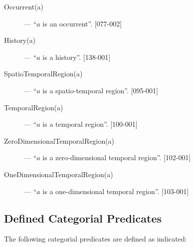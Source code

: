 \documentclass{article}
\newcommand{\DF}{\ensuremath{=_{df}}}
\begin{document}
\begin{description}
\item[Occurrent(a)] --- ``$a$ is an occurrent''. [077-002]

\item[History(a)] --- ``$a$ is a history''.  [138-001]

\item[SpatioTemporalRegion(a)] --- ``$a$ is a spatio-temporal region''. [095-001]

\item[TemporalRegion(a)] --- ``$a$ is a temporal region''. [100-001]

\item[ZeroDimensionalTemporalRegion(a)] --- ``$a$ is a zero-dimensional temporal region''. [102-001]

\item[OneDimensionalTemporalRegion(a)] --- ``$a$ is a one-dimensional temporal region''. [103-001]

\end{description}





\subsection{Defined Categorial Predicates}

The following categorial predicates are defined as indicated:
\end{document}
